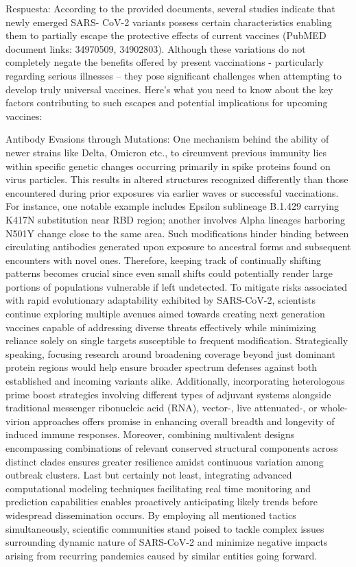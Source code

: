 Respuesta: According to the provided documents, several studies indicate that newly emerged SARS- CoV-2 variants possess certain characteristics enabling them to partially escape the protective effects of current vaccines (PubMED document links: 34970509, 34902803). Although these variations do not completely negate the benefits offered by present vaccinations - particularly regarding serious illnesses – they pose significant challenges when attempting to develop truly universal vaccines. Here’s what you need to know about the key factors contributing to such escapes and potential implications for upcoming vaccines:

Antibody Evasions through Mutations: One mechanism behind the ability of newer strains like Delta, Omicron etc., to circumvent previous immunity lies within specific genetic changes occurring primarily in spike proteins found on virus particles. This results in altered structures recognized differently than those encountered during prior exposures via earlier waves or successful vaccinations. For instance, one notable example includes Epsilon sublineage B.1.429 carrying K417N substitution near RBD region; another involves Alpha lineages harboring N501Y change close to the same area. Such modifications hinder binding between circulating antibodies generated upon exposure to ancestral forms and subsequent encounters with novel ones. Therefore, keeping track of continually shifting patterns becomes crucial since even small shifts could potentially render large portions of populations vulnerable if left undetected. To mitigate risks associated with rapid evolutionary adaptability exhibited by SARS-CoV-2, scientists continue exploring multiple avenues aimed towards creating next generation vaccines capable of addressing diverse threats effectively while minimizing reliance solely on single targets susceptible to frequent modification. Strategically speaking, focusing research around broadening coverage beyond just dominant protein regions would help ensure broader spectrum defenses against both established and incoming variants alike. Additionally, incorporating heterologous prime boost strategies involving different types of adjuvant systems alongside traditional messenger ribonucleic acid (RNA), vector-, live attenuated-, or whole-virion approaches offers promise in enhancing overall breadth and longevity of induced immune responses. Moreover, combining multivalent designs encompassing combinations of relevant conserved structural components across distinct clades ensures greater resilience amidst continuous variation among outbreak clusters. Last but certainly not least, integrating advanced computational modeling techniques facilitating real time monitoring and prediction capabilities enables proactively anticipating likely trends before widespread dissemination occurs. By employing all mentioned tactics simultaneously, scientific communities stand poised to tackle complex issues surrounding dynamic nature of SARS-CoV-2 and minimize negative impacts arising from recurring pandemics caused by similar entities going forward.

